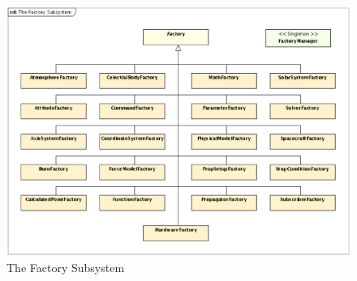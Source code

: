 \documentclass[letterpaper,10pt]{article}
\begin{document}
\begin{figure}[tb]
\begin{center}
\includegraphics[bb=0 0 800 586,scale=0.5,clip]
{Images/TheFactorySubsystem.eps}
\caption{\label{fig:FactorySubsystem} The Factory Subsystem}
\end{center}
\end{figure}
\end{document}

